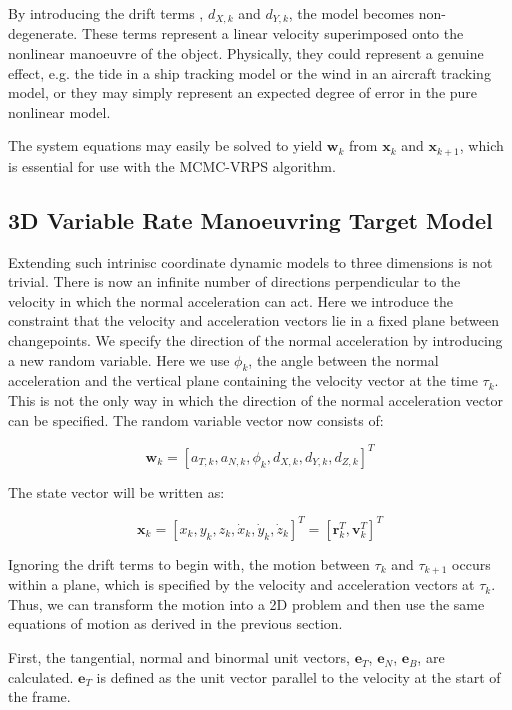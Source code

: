 \documentclass[a4paper,10pt]{article}
\begin{document}
By introducing the drift terms , $d_{X,k}$ and $d_{Y,k}$, the model becomes non-degenerate. These terms represent a linear velocity superimposed onto the nonlinear manoeuvre of the object. Physically, they could represent a genuine effect, e.g. the tide in a ship tracking model or the wind in an aircraft tracking model, or they may simply represent an expected degree of error in the pure nonlinear model.

The system equations may easily be solved to yield $\mathbf{w}_k$ from $\mathbf{x}_k$ and $\mathbf{x}_{k+1}$, which is essential for use with the MCMC-VRPS algorithm.



\subsection{3D Variable Rate Manoeuvring Target Model}
Extending such intrinisc coordinate dynamic models to three dimensions is not trivial. There is now an infinite number of directions perpendicular to the velocity in which the normal acceleration can act. Here we introduce the constraint that the velocity and acceleration vectors lie in a fixed plane between changepoints. We specify the direction of the normal acceleration by introducing a new random variable. Here we use $\phi_k$, the angle between the normal acceleration and the vertical plane containing the velocity vector at the time $\tau_k$. This is not the only way in which the direction of the normal acceleration vector can be specified. The random variable vector now consists of:

\begin{equation}
\mathbf{w}_k = [a_{T,k}, a_{N,k}, \phi_k, d_{X,k}, d_{Y,k}, d_{Z,k}]^T
\end{equation}

The state vector will be written as:

\begin{equation}
\mathbf{x}_k = [x_k, y_k, z_k, \dot{x}_k, \dot{y}_k, \dot{z}_k]^T = [\mathbf{r}_k^T, \mathbf{v}_k^T]^T
\end{equation}

Ignoring the drift terms to begin with, the motion between $\tau_k$ and $\tau_{k+1}$ occurs within a plane, which is specified by the velocity and acceleration vectors at $\tau_k$. Thus, we can transform the motion into a 2D problem and then use the same equations of motion as derived in the previous section.

First, the tangential, normal and binormal unit vectors, $\mathbf{e}_T$, $\mathbf{e}_N$, $\mathbf{e}_B$, are calculated. $\mathbf{e}_T$ is defined as the unit vector parallel to the velocity at the start of the frame.
\end{document}
